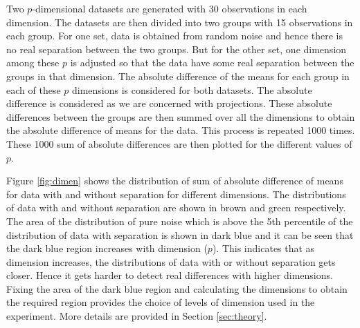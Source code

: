 Two $p$-dimensional datasets are generated with 30 observations in each dimension. The datasets are then divided into two groups with 15 observations in each group. For one set, data is obtained from random noise and hence there is no real separation between the two groups. But for the other set, one dimension among these $p$ is adjusted so that the data have some real separation between the groups in that dimension. The absolute difference of the means for each group in each of these $p$ dimensions is considered for both datasets. The absolute difference is considered as we are concerned with projections. These absolute differences between the groups are then summed over all the dimensions to obtain the absolute difference of means for the data. This process is repeated 1000 times. These 1000 sum of absolute differences are then plotted for the different values of $p$.
 
Figure \ref{fig:dimen} shows the distribution of sum of absolute difference of means for data with and without separation for different dimensions. The distributions of data with and without separation are shown in brown and green respectively. The area of the distribution of pure noise which is above the 5th percentile of the distribution of data with separation is shown in dark blue and it can be seen that the dark blue region increases with dimension ($p$). This indicates that as dimension increases, the distributions of data with or without separation gets closer. Hence it gets harder to detect real differences with higher dimensions. Fixing the area of the dark blue region and calculating the dimensions to obtain the required region provides the choice of levels of dimension used in the experiment. More details are provided in Section \ref{sec:theory}. 

